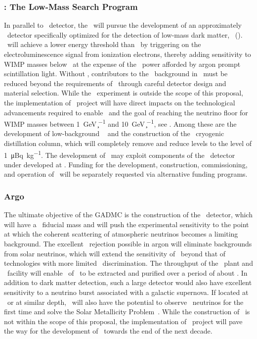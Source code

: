 \subsubsection{\DSl: The Low-Mass Search Program}
\label{sec:DSl}


In parallel to \DSks\ detector, the \GADMC\ will pursue the development of an approximately \DSlApproxMassScale\ detector specifically optimized for the detection of low-mass dark matter, \DSl\ (\DSls).  \DSls\ will achieve a lower energy threshold than \DSks\ by triggering on the electroluminescence signal from ionization electrons, thereby adding sensitivity to WIMP masses below \DSlLowMassThreshold\ at the expense of the \PSD\ power afforded by argon prompt scintillation light.  Without \PSD, contributors to the \ER\ background in \DSls\ must be reduced beyond the requirements of \DSks\ through careful detector design and material selection. While the \DSls\ experiment is outside the scope of this proposal, the implementation of \DSk\ project will have direct impacts on the technological advancements required to enable \DSls\ and the goal of reaching the neutrino floor for WIMP masses between \SI{1}{\GeV\per\c\squared} and \SI{10}{\GeV\per\c\squared}, see .  Among these are the development of low-background \DSkPdms~\cite{DIncecco:2018fx,DIncecco:2018hy} and the construction of the \Aria\ cryogenic distillation column, which will completely remove  and reduce  levels to the level of \SI{1}{\micro\becquerel\per\kg}.  The development of \DSls\ may exploit components of the \DSps\ detector under developed at \CERN.  Funding for the development, construction, commissioning, and operation of \DSls\ will be separately requested via alternative funding programs.


\subsubsection{Argo}
\label{sec:Argo}

The ultimate objective of the GADMC is the construction of the \Argo\ detector, which will have a \GADMCFiducialMass\ fiducial mass and will push the experimental sensitivity to the point at which the coherent scattering of atmospheric neutrinos becomes a limiting background. The excellent \ER\ rejection possible in argon will eliminate backgrounds from solar neutrinos, which will extend the sensitivity of \Argo\ beyond that of technologies with more limited \ER\ discrimination. The throughput  of the \Urania\ plant and \Aria\ facility will enable \ArgoTotalMass\ of \UAr\ to be extracted and purified over a period of about \ArgoExtractionPeriod.  In addition to dark matter detection, such a large detector would also have excellent sensitivity to a neutrino burst associated with a galactic supernova.  If located at \SNOLAB\ or at similar depth, \Argo\ will also have the potential to observe \CNO\ neutrinos for the first time and solve the Solar Metallicity Problem~\cite{Franco:2016ex}.  While the construction of \Argo\ is not within the scope of this proposal, the implementation of  \DSk\ project will pave the way for the development of \Argo\ towards the end of the next decade. 

